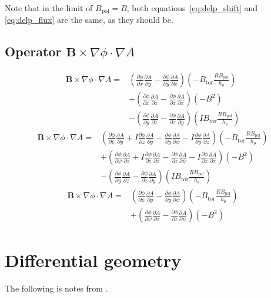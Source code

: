 \documentclass[12pt]{article}
\newcommand{\deriv}[2]{\ensuremath{\frac{\partial #1}{\partial #2}}}
\newcommand{\hthe}{\ensuremath{h_\theta}}
\newcommand{\Bp}{\ensuremath{B_{\text{pol}}}}
\newcommand{\Bt}{\ensuremath{B_{\text{tor}}}}
\newcommand{\ve}[1]{\ensuremath{\boldsymbol{#1}}}
\newcommand{\Bvec}{\ve{B}}
\newcommand{\rbp}{\ensuremath{R\Bp}}
\begin{document}
Note that in the limit of $\Bp = B$, both equations~\ref{eq:delp_shift} and
\ref{eq:delp_flux} are the same, as they should be.



\subsection{Operator \texorpdfstring{$\Bvec\times\nabla\phi\cdot\nabla A$}
%
{B x Nabla Phi Dot Nabla A}}
%
\begin{align*}
\Bvec\times\nabla\phi\cdot\nabla A =& \left(\deriv{\phi}{x}\deriv{A}{y} -
\deriv{\phi}{y}\deriv{A}{x}\right)\left(-\Bt\frac{\rbp}{\hthe}\right) \\ &+
    \left(\deriv{\phi}{x}\deriv{A}{z} -
    \deriv{\phi}{z}\deriv{A}{x}\right)\left(-B^2\right) \\ &-
        \left(\deriv{\phi}{y}\deriv{A}{z} -
        \deriv{\phi}{z}\deriv{A}{y}\right)\left(I\Bt\frac{\rbp}{\hthe}\right)
\end{align*}
%
\begin{align*}
\Bvec\times\nabla\phi\cdot\nabla A =& \left(\deriv{\phi}{\psi}\deriv{A}{y} + I
\deriv{\phi}{z}\deriv{A}{y} - \deriv{\phi}{y}\deriv{A}{\psi} -
I\deriv{\phi}{y}\deriv{A}{z}\right)\left(-\Bt\frac{\rbp}{\hthe}\right) \\ &+
\left(\deriv{\phi}{\psi}\deriv{A}{z} + I\deriv{\phi}{z}\deriv{A}{z} -
\deriv{\phi}{z}\deriv{A}{\psi} -
I\deriv{\phi}{z}\deriv{A}{z}\right)\left(-B^2\right) \\ &-
\left(\deriv{\phi}{y}\deriv{A}{z} -
\deriv{\phi}{z}\deriv{A}{y}\right)\left(I\Bt\frac{\rbp}{\hthe}\right)
\end{align*}
%
\begin{align*}
\Bvec\times\nabla\phi\cdot\nabla A =& \left(\deriv{\phi}{\psi}\deriv{A}{y} -
\deriv{\phi}{y}\deriv{A}{\psi}\right)\left(-\Bt\frac{\rbp}{\hthe}\right)
\nonumber \\ &+ \left(\deriv{\phi}{\psi}\deriv{A}{z} -
\deriv{\phi}{z}\deriv{A}{\psi} \right)\left(-B^2\right)
\end{align*}
%
 

\appendix





\section{Differential geometry}
%
The following is notes from \cite{hazeltine-2003}.
\end{document}
